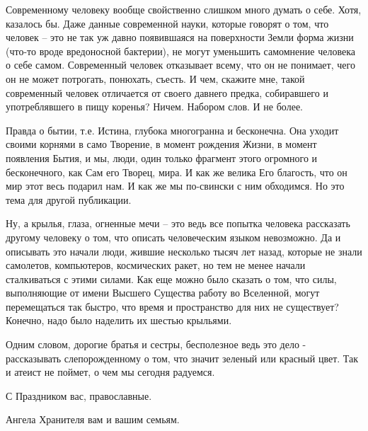 Современному человеку вообще свойственно слишком много думать о себе. Хотя,
казалось бы. Даже данные современной науки, которые говорят о том, что человек
– это не так уж давно появившаяся на поверхности Земли форма жизни (что-то
вроде вредоносной бактерии), не могут уменьшить самомнение человека о себе
самом. Современный человек отказывает всему, что он не понимает, чего он не
может потрогать, понюхать, съесть. И чем, скажите мне, такой современный
человек отличается от своего давнего предка, собиравшего и употреблявшего в
пищу коренья? Ничем. Набором слов. И не более.

Правда о бытии, т.е. Истина, глубока многогранна и бесконечна. Она уходит
своими корнями в само Творение, в момент рождения Жизни, в момент появления
Бытия, и мы, люди, один только фрагмент этого огромного и бесконечного, как Сам
его Творец, мира. И как же велика Его благость, что он мир этот весь подарил
нам. И как же мы по-свински  с ним обходимся. Но это тема для другой
публикации.

Ну, а крылья, глаза, огненные мечи – это ведь все попытка человека рассказать
другому человеку о том, что описать человеческим языком невозможно. Да и
описывать это начали люди, жившие несколько тысяч лет назад, которые не знали
самолетов, компьютеров, космических ракет, но тем не менее начали сталкиваться
с этими силами. Как еще можно было сказать о том, что силы, выполняющие от
имени Высшего Существа работу во Вселенной, могут перемещаться так быстро, что
время и пространство для них не существует? Конечно, надо было наделить их
шестью крыльями.

Одним словом, дорогие братья и сестры, бесполезное ведь это дело - рассказывать
слепорожденному о том, что значит зеленый или красный цвет. Так и атеист не
поймет, о чем мы сегодня радуемся.

С Праздником вас, православные.

Ангела Хранителя вам и вашим семьям.
